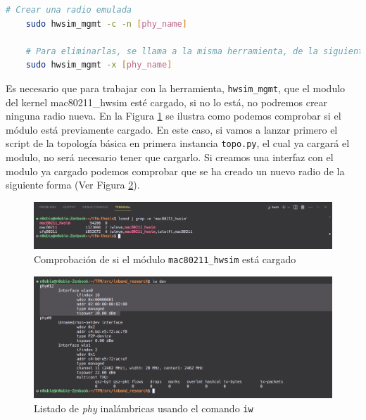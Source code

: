 \begin{lstlisting}[language= bash, style=Consola, caption={Operativa básica de la herramienta hwsim\_mgmt},label=code:hwsim]
    # Crear una radio emulada
    sudo hwsim_mgmt -c -n [phy_name]

    # Para eliminarlas, se llama a la misma herramienta, de la siguiente manera
    sudo hwsim_mgmt -x [phy_name]
\end{lstlisting}
\vspace{0.5cm}

Es necesario que para trabajar con la herramienta, \texttt{hwsim\_mgmt}, que el modulo del kernel mac80211\_hwsim esté cargado, si no lo está, no podremos crear ninguna radio nueva. En la Figura \ref{fig:debugBOFUSS_2} se ilustra como podemos comprobar si el módulo está previamente cargado. En este caso, si vamos a lanzar primero el script de la topología básica en primera instancia \texttt{topo.py},  el cual ya cargará el modulo, no será necesario tener que cargarlo. Si creamos una interfaz con el modulo ya cargado podemos comprobar que se ha creado un nuevo radio de la siguiente forma (Ver Figura \ref{fig:debugBOFUSS_3}).

\begin{figure}[ht!]
    \centering
    \includegraphics[width=\textwidth]{archivos/img/analisis/debugBOFUSS_2.png}
    \caption{Comprobación de si el módulo \texttt{mac80211\_hwsim} está cargado}
    \label{fig:debugBOFUSS_2}
\end{figure}

\begin{figure}[ht!]
    \centering
    \includegraphics[width=\textwidth]{archivos/img/analisis/debugBOFUSS_3.png}
    \caption{Listado de \textit{phy} inalámbricas usando el comando \texttt{iw}}
    \label{fig:debugBOFUSS_3}
\end{figure}


